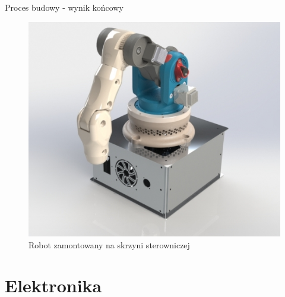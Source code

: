 \documentclass{beamer}
\begin{document}
\begin{frame}{Proces budowy - wynik końcowy}
	\begin{figure}%
		\centering
		\includegraphics[width=.6\textwidth]{img/calosc_stolik.jpg} 
			\caption{Robot zamontowany na skrzyni sterowniczej}
			\label{fig:konstrukcja:wynik}%
		\end{figure}
\end{frame}


\section{Elektronika}
\end{document}
